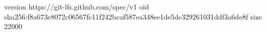 version https://git-lfs.github.com/spec/v1
oid sha256:f8a673e8072c06567fc11f242bcaf587ea348ee1de5dc329261031ddf3a6de8f
size 22000
